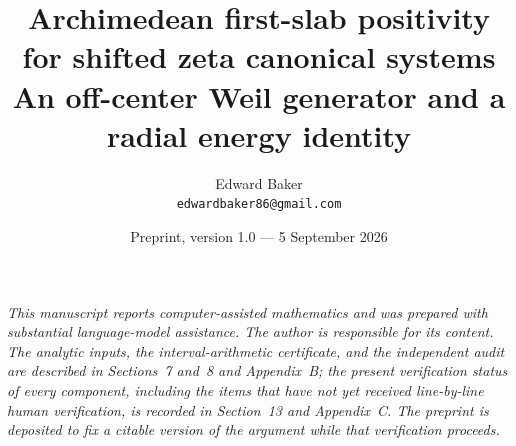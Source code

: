 \documentclass[11pt,a4paper]{article}
\title{\textbf{Archimedean first-slab positivity for shifted zeta canonical systems}\\[1ex]
\large An off-center Weil generator and a radial energy identity}
\author{Edward Baker\\[0.5ex]
\normalsize \texttt{edwardbaker86@gmail.com}}
\date{Preprint, version 1.0 --- 5 September 2026}
\theoremstyle{plain}
\theoremstyle{definition}
\numberwithin{equation}{section}
\begin{document}
\maketitle

\begin{center}
\begin{minipage}{0.9\textwidth}
\small\itshape
This manuscript reports computer-assisted mathematics and was prepared with
substantial language-model assistance. The author is responsible for its
content. The analytic inputs, the interval-arithmetic certificate, and the
independent audit are described in Sections~7 and~8 and Appendix~B; the
present verification status of every component, including the items that
have not yet received line-by-line human verification, is recorded in
Section~13 and Appendix~C. The preprint is deposited to fix a citable
version of the argument while that verification proceeds.
\end{minipage}
\end{center}
\end{document}
